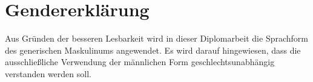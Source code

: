 \chapter*{Gendererklärung}

Aus Gründen der besseren Lesbarkeit wird in dieser Diplomarbeit die Sprachform des generischen Maskulinums angewendet. Es wird darauf hingewiesen, dass die ausschließliche Verwendung der männlichen Form geschlechtsunabhängig verstanden werden soll.
